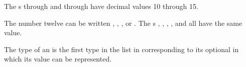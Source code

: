 \pnum
The s
 through  and  through 
have decimal values 10 through 15.
\begin{example}
The number twelve can be written , ,
, or . The s ,
, , , and
 all have the same value.
\end{example}

\pnum
{}%
%
%
%
%
%
%
%
The type of an  is
the first type in the list in 
corresponding to its optional 
in which its value can be represented.

